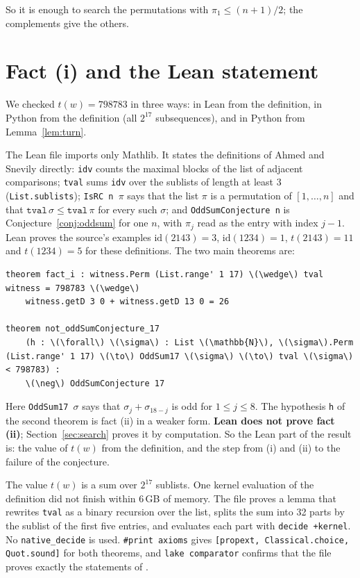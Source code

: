 \documentclass[11pt]{article}
\theoremstyle{remark}
\begin{document}
So it is enough to search the permutations with $\pi_1 \le (n+1)/2$; the complements give the others.

\section{Fact (i) and the Lean statement}\label{sec:lean}

We checked $t(w) = 798783$ in three ways: in Lean from the definition, in Python from the definition (all $2^{17}$ subsequences), and in Python from Lemma~\ref{lem:turn}.

The Lean file  imports only Mathlib. It states the definitions of Ahmed and Snevily directly: \texttt{idv} counts the maximal blocks of the list of adjacent comparisons; \texttt{tval} sums \texttt{idv} over the sublists of length at least 3 (\texttt{List.sublists}); \texttt{IsRC n $\pi$} says that the list $\pi$ is a permutation of $[1, \dots, n]$ and that $\mathtt{tval}\,\sigma \le \mathtt{tval}\,\pi$ for every such $\sigma$; and \texttt{OddSumConjecture n} is Conjecture~\ref{conj:oddsum} for one $n$, with $\pi_j$ read as the entry with index $j - 1$. Lean proves the source's examples $\mathrm{id}(2143) = 3$, $\mathrm{id}(1234) = 1$, $t(2143) = 11$ and $t(1234) = 5$ for these definitions. The two main theorems are:
\begin{Verbatim}[fontsize=\small,commandchars=\\\{\}]
theorem fact_i : witness.Perm (List.range' 1 17) \(\wedge\) tval witness = 798783 \(\wedge\)
    witness.getD 3 0 + witness.getD 13 0 = 26

theorem not_oddSumConjecture_17
    (h : \(\forall\) \(\sigma\) : List \(\mathbb{N}\), \(\sigma\).Perm (List.range' 1 17) \(\to\) OddSum17 \(\sigma\) \(\to\) tval \(\sigma\) < 798783) :
    \(\neg\) OddSumConjecture 17
\end{Verbatim}
Here \texttt{OddSum17 $\sigma$} says that $\sigma_j + \sigma_{18-j}$ is odd for $1 \le j \le 8$. The hypothesis \texttt{h} of the second theorem is fact (ii) in a weaker form. \textbf{Lean does not prove fact (ii)}; Section~\ref{sec:search} proves it by computation. So the Lean part of the result is: the value of $t(w)$ from the definition, and the step from (i) and (ii) to the failure of the conjecture.

The value $t(w)$ is a sum over $2^{17}$ sublists. One kernel evaluation of the definition did not finish within 6\,GB of memory. The file proves a lemma that rewrites \texttt{tval} as a binary recursion over the list, splits the sum into 32 parts by the sublist of the first five entries, and evaluates each part with \texttt{decide +kernel}. No \texttt{native\_decide} is used. \texttt{\#print axioms} gives \texttt{[propext, Classical.choice, Quot.sound]} for both theorems, and \texttt{lake comparator} confirms that the file proves exactly the statements of .
\end{document}
